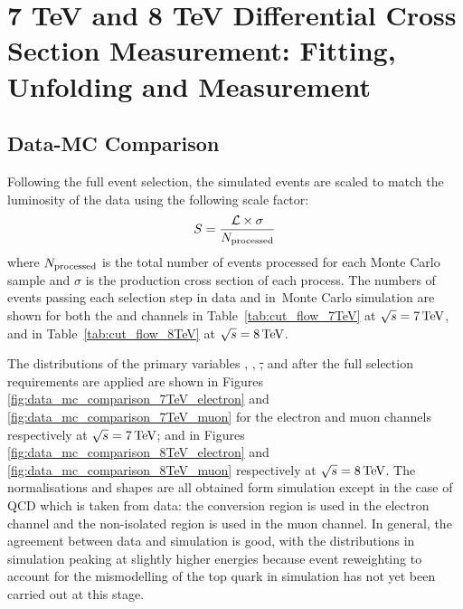 \chapter{7 TeV and 8 TeV Differential Cross Section Measurement: Fitting, Unfolding and Measurement}
\label{c:Differential_Cross_Section:fitting_and_unfolding}


\section{Data-MC Comparison}
\label{ss:data-mc_comparison}
Following the full event selection, the simulated events are scaled to match the luminosity of the data using
the following scale factor:
\begin{equation}
  S = \frac{{\cal L} \times  \sigma}{N_{\rm processed}}
\end{equation}
where $N_{\rm processed}$ is the total number of events processed for each Monte Carlo sample and $\sigma$ is
the production cross section of each process. The numbers of events passing each selection step in data and
in Monte Carlo simulation are shown for both the \eplusjets and \muplusjets channels in
Table~\ref{tab:cut_flow_7TeV} at $\sqrt{s}=7\,\text{Te\hspace{-.08em}V}$, and in Table~\ref{tab:cut_flow_8TeV} at $\sqrt{s}=8\,\text{Te\hspace{-.08em}V}$.




The distributions of the primary variables \met, \HT, \st, \wpt and \mt after the full selection requirements
are applied are shown in Figures \ref{fig:data_mc_comparison_7TeV_electron} and
\ref{fig:data_mc_comparison_7TeV_muon} for the electron and muon channels respectively at $\sqrt{s}=7\,\text{Te\hspace{-.08em}V}$;
and in Figures \ref{fig:data_mc_comparison_8TeV_electron} and \ref{fig:data_mc_comparison_8TeV_muon}
respectively at $\sqrt{s}=8\,\text{Te\hspace{-.08em}V}$. The normalisations and shapes are all obtained form simulation except in the
case of QCD which is taken from data: the conversion region is used in the electron channel and the
non-isolated region is used in the muon channel. In general, the agreement between data and simulation is
good, with the distributions in simulation peaking at slightly higher energies because event reweighting to
account for the \pt mismodelling of the top quark in simulation has not yet been carried out at this stage.

